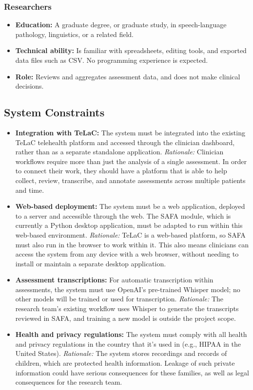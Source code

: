 \documentclass[12pt]{article}
\begin{document}
\subsubsection{Researchers}
\begin{itemize}
  \item \textbf{Education:} A graduate degree, or graduate study, in speech-language pathology, linguistics, or a related field. 
  \item \textbf{Technical ability:} Is familiar with spreadsheets, editing tools, and exported data files such as CSV. No programming experience is expected.
  \item \textbf{Role:} Reviews and aggregates assessment data, and does not make clinical decisions.
\end{itemize}

\subsection{System Constraints} \label{sec:SystemConstraints}

\begin{itemize}
\item \textbf{Integration with TeLaC:} The system must be integrated into the
  existing TeLaC telehealth platform and accessed through the clinician dashboard,
  rather than as a separate standalone application. \textit{Rationale:} Clinician
  workflows require more than just the analysis of a single assessment. In order to 
  connect their work, they should have a platform that is able to help collect, review,
  transcribe, and annotate assessments across multiple patients and time.

\item \textbf{Web-based deployment:} The system must be a web application, deployed
  to a server and accessible through the web. The SAFA module, which is currently a
  Python desktop application, must be adapted to run within this web-based environment.
  \textit{Rationale:} TeLaC is a web-based platform, so SAFA must also run in the
  browser to work within it. This also means clinicians can access the system from
  any device with a web browser, without needing to install or maintain a separate
  desktop application.

\item \textbf{Assessment transcriptions:} For automatic transcription within
  assessments, the system must use
  OpenAI's pre-trained Whisper model; no other models will be trained or used for
  transcription. \textit{Rationale:} The research team's existing workflow uses 
  Whisper to generate the transcripts reviewed in SAFA, and training a new model 
  is outside the project scope.

\item \textbf{Health and privacy regulations:} The system must comply with all
  health and privacy regulations in the country that it's used in (e.g., HIPAA
  in the United States). \textit{Rationale:} The system stores
  recordings and records of children, which are protected health information.
  Leakage of such private information could have serious consequences for these
  families, as well as legal consequences for the research team.
\end{itemize}
\end{document}
